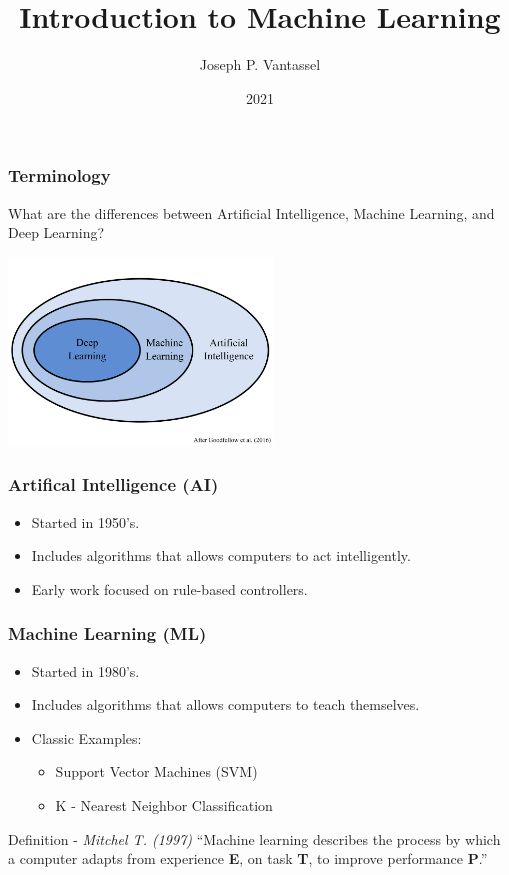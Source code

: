 \documentclass{beamer}
\title{Introduction to Machine Learning}
\author{Joseph P. Vantassel}
\institute{The University of Texas at Austin}
\date{2021}
\begin{document}
\frame{\titlepage}


\begin{frame}

\frametitle{Terminology}

What are the differences between Artificial Intelligence, Machine Learning, and Deep Learning?

\begin{center}
\includegraphics[height=5cm]{figs/ai_ml_dl_diagram.png}
\end{center}

\end{frame}


\begin{frame}

\frametitle{Artifical Intelligence (AI)}

\begin{itemize}
    \item Started in 1950's.
    \item Includes algorithms that allows computers to act intelligently.
    \item Early work focused on rule-based controllers.
\end{itemize}

\end{frame}


\begin{frame}

\frametitle{Machine Learning (ML)}

\begin{itemize}
    \item Started in 1980's.
    \item Includes algorithms that allows computers to teach themselves.
    \item Classic Examples:
    \begin{itemize}
        \item Support Vector Machines (SVM)
        \item K - Nearest Neighbor Classification
    \end{itemize}
\end{itemize}

\begin{block}{Definition - \textit{Mitchel T. (1997)}}
    ``Machine learning describes the process by which a computer adapts
    from experience \textbf{E}, on task \textbf{T}, to improve
    performance \textbf{P}.''
\end{block}

\end{frame}
\end{document}
